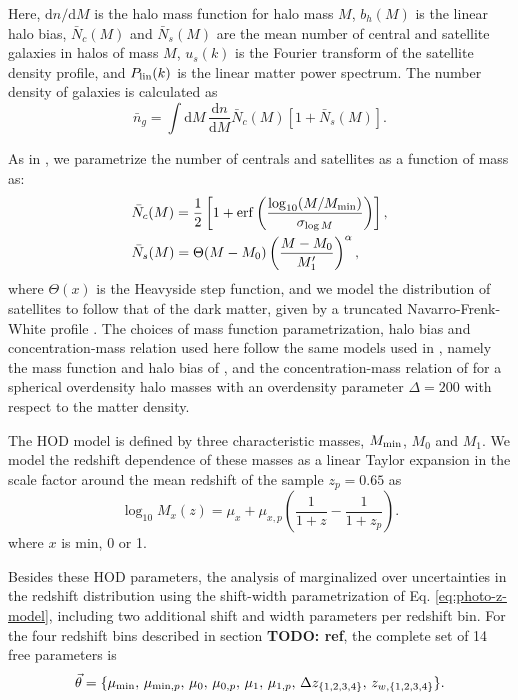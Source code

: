 \documentclass[a4paper,11pt]{article}
\newcommand{\todo}[1]{{\bf TODO: #1}}
\begin{document}
      Here, $\mathrm{d}n/\mathrm{d}M$ is the halo mass function for halo mass $M$, $b_h(M)$ is the linear halo bias, $\bar{N}_c(M)$ and $\bar{N}_s(M)$ are the mean number of central and satellite galaxies in halos of mass $M$, $u_s(k)$ is the Fourier transform of the satellite density profile, and $P_{\rm lin}(k)$ is the linear matter power spectrum. The number density of galaxies is calculated as 
      \begin{equation}
        \bar{n}_g=\int \mathrm{d}M\,\frac{\mathrm{d}n}{\mathrm{d}M}\bar{N}_c(M)\left[1+\bar{N}_s(M)\right].
        \label{eq:ng_hod}
      \end{equation}    
    
      As in \cite{1912.08209}, we parametrize the number of centrals and satellites as a function of mass as:
      \begin{align}
        &\bar{N}_c(M)=\frac{1}{2}\left[1+{\rm erf}\left(\frac{\log_{10}(M/M_{\rm min})}{\sigma_{\log M}}\right)\right],\\
        &\bar{N}_s(M)=\Theta(M-M_0)\left(\frac{M-M_0}{M_1'}\right)^\alpha,
      \end{align}
      where $\Theta(x)$ is the Heavyside step function, and we model the distribution of satellites to follow that of the dark matter, given by a truncated Navarro-Frenk-White profile \cite{Navarro:1996}. The choices of mass function parametrization, halo bias and concentration-mass relation used here follow the same models used in \cite{1912.08209}, namely the mass function and halo bias of \cite{Tinker:2010}, and the concentration-mass relation of \cite{Duffy:2008} for a spherical overdensity halo masses with an overdensity parameter $\Delta=200$ with respect to the matter density.
 
      The HOD model is defined by three characteristic masses, $M_{\rm min}$, $M_0$ and $M_1$. We model the redshift dependence of these masses as a linear Taylor expansion in the scale factor around the mean redshift of the sample $z_p=0.65$ as
      \begin{equation}
        \log_{10}{M_x(z)} = \mu_x + \mu_{x, p} \left(\frac{1}{1+z} - \frac{1}{1+z_{p}}\right).
      \end{equation}
      where $x$ is $\mathrm{min}$, 0 or 1.
    
      Besides these HOD parameters, the analysis of \cite{1912.08209} marginalized over uncertainties in the redshift distribution using the shift-width parametrization of Eq. \ref{eq:photo-z-model}, including two additional shift and width parameters per redshift bin. For the four redshift bins described in section \todo{ref}, the complete set of 14 free parameters is
      \begin{equation}
        \vec{\theta}=\{\mu_{\rm min},\,\mu_{{\rm min},p},\,\mu_0,\,\mu_{0,p},\,\mu_1,\,\mu_{1,p},\,\Delta z_{\{1,2,3,4\}},\,z_{w,\{1,2,3,4\}}\}.
      \end{equation}
\end{document}
